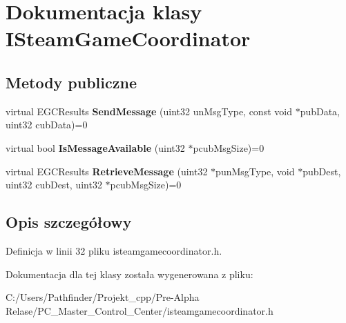 \hypertarget{class_i_steam_game_coordinator}{}\section{Dokumentacja klasy I\+Steam\+Game\+Coordinator}
\label{class_i_steam_game_coordinator}
\subsection*{Metody publiczne}
\begin{DoxyCompactItemize}
\item 
\mbox{\label{class_i_steam_game_coordinator_ad7d6f6607739bcb8472663c6f5f3a88a}} 
virtual E\+G\+C\+Results {\bfseries Send\+Message} (uint32 un\+Msg\+Type, const void $\ast$pub\+Data, uint32 cub\+Data)=0
\item 
\mbox{\label{class_i_steam_game_coordinator_a7f94e0837dfc4d68eb642c7f7068c80d}} 
virtual bool {\bfseries Is\+Message\+Available} (uint32 $\ast$pcub\+Msg\+Size)=0
\item 
\mbox{\label{class_i_steam_game_coordinator_a332264ad3ba309a2f003cb84002b5245}} 
virtual E\+G\+C\+Results {\bfseries Retrieve\+Message} (uint32 $\ast$pun\+Msg\+Type, void $\ast$pub\+Dest, uint32 cub\+Dest, uint32 $\ast$pcub\+Msg\+Size)=0
\end{DoxyCompactItemize}


\subsection{Opis szczegółowy}


Definicja w linii 32 pliku isteamgamecoordinator.\+h.



Dokumentacja dla tej klasy została wygenerowana z pliku\+:\begin{DoxyCompactItemize}
\item 
C\+:/\+Users/\+Pathfinder/\+Projekt\+\_\+cpp/\+Pre-\/\+Alpha Relase/\+P\+C\+\_\+\+Master\+\_\+\+Control\+\_\+\+Center/isteamgamecoordinator.\+h\end{DoxyCompactItemize}
